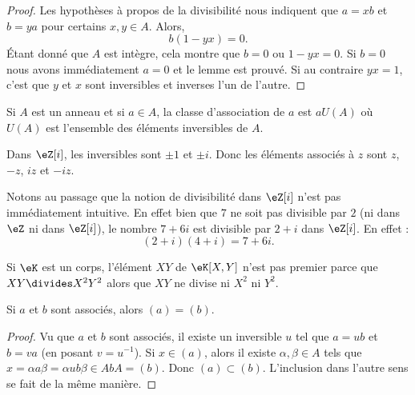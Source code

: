 \begin{proof}
	Les hypothèses à propos de la divisibilité nous indiquent que \( a=xb\) et \( b=ya\) pour certains \( x,y\in A\). Alors,
	\begin{equation}
		b(1-yx)=0.
	\end{equation}
	Étant donné que \( A\) est intègre, cela montre que \( b=0\) ou \( 1-yx=0\). Si \( b=0\) nous avons immédiatement \( a=0\) et le lemme est prouvé. Si au contraire \( yx=1\), c'est que \( y\) et \( x\) sont inversibles et inverses l'un de l'autre.
\end{proof}

\begin{lemma}       \label{LEMooJBOXooYkMRrz}
	Si \( A\) est un anneau et si \( a\in A\), la classe d'association de \( a\) est \( aU(A)\) où \( U(A)\) est l'ensemble des éléments inversibles de \( A\).
\end{lemma}

\begin{example}
	Dans \( \eZ[i]\), les inversibles sont \( \pm 1\) et \( \pm i\). Donc les éléments associés à \( z\) sont \( z\), \( -z\), \( iz\) et \( -iz\).

	Notons au passage que la notion de divisibilité dans \( \eZ[i]\) n'est pas immédiatement intuitive. En effet bien que \( 7\) ne soit pas divisible par \( 2\) (ni dans \( \eZ\) ni dans \( \eZ[i]\)), le nombre \( 7+6i\) est divisible par \( 2+i\) dans \( \eZ[i]\). En effet :
	\begin{equation}
		(2+i)(4+i)=7+6i.
	\end{equation}
\end{example}

\begin{example}
	Si \( \eK\) est un corps, l'élément \( XY\) de \( \eK[X,Y]\) n'est pas premier parce que \( XY\divides X^2Y^2\) alors que \( XY\) ne divise ni \( X^2\) ni \( Y^2\).
\end{example}


\begin{lemma}	\label{LEMooLXPSooYjULCJ}
	Si \( a\) et \( b\) sont associés, alors \( (a)=(b)\).
\end{lemma}

\begin{proof}
	Vu que \( a\) et \( b\) sont associés, il existe un inversible \( u\) tel que \( a=ub\) et \( b=va\) (en posant \( v=u^{-1}\)). Si \( x\in(a)\), alors il existe \( \alpha,\beta\in A\) tels que \( x=\alpha a\beta=\alpha ub\beta\in AbA=(b)\). Donc \( (a)\subset (b)\). L'inclusion dans l'autre sens se fait de la même manière.
\end{proof}

